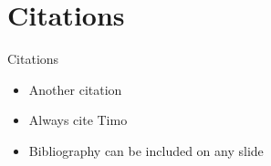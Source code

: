 \section{Citations}


\begin{frame}[c]{Citations}
    \begin{itemize}
        \item Another citation
        \item Always cite Timo
        \item Bibliography can be included on any slide
    \end{itemize}

    \printbibliography%
\end{frame}

